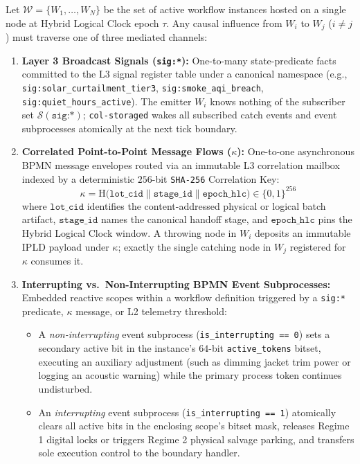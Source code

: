 \begin{definition}
\label{def:three-choreography-channels}
Let $\mathcal{W} = \{W_1, \dots, W_N\}$ be the set of active workflow instances hosted on a single node at
Hybrid Logical Clock epoch $\tau$. Any causal influence from $W_i$ to $W_j$ ($i \neq j$) must traverse one
of three mediated channels:
\begin{enumerate}
    \item \textbf{Layer 3 Broadcast Signals (\texttt{sig:*}):} One-to-many state-predicate facts committed
        to the L3 signal register table under a canonical namespace (e.g.,
        \texttt{sig:solar\_curtailment\_tier3}, \texttt{sig:smoke\_aqi\_breach},
        \texttt{sig:quiet\_hours\_active}). The emitter $W_i$ knows nothing of the subscriber set
        $\mathcal{S}(\texttt{sig:*})$; \texttt{col-storaged} wakes all subscribed catch events and event
        subprocesses atomically at the next tick boundary.
    \item \textbf{Correlated Point-to-Point Message Flows ($\kappa$):} One-to-one asynchronous BPMN
        message envelopes routed via an immutable L3 correlation mailbox indexed by a deterministic
        $256$-bit \texttt{SHA-256} Correlation Key:
    \begin{equation}
    \label{eq:correlation-key}
    \kappa = \mathrm{H}\bigl(\texttt{lot\_cid} \parallel \texttt{stage\_id} \parallel \texttt{epoch\_hlc}\bigr) \in \{0,1\}^{256}
    \end{equation}
    where $\texttt{lot\_cid}$ identifies the content-addressed physical or logical batch artifact,
    $\texttt{stage\_id}$ names the canonical handoff stage, and $\texttt{epoch\_hlc}$ pins the Hybrid
    Logical Clock window. A throwing node in $W_i$ deposits an immutable IPLD payload under $\kappa$;
    exactly the single catching node in $W_j$ registered for $\kappa$ consumes it.
    \item \textbf{Interrupting vs.\ Non-Interrupting BPMN Event Subprocesses:} Embedded reactive scopes
        within a workflow definition \parencite{harel1987statecharts,omg2011bpmn} triggered by a
        \texttt{sig:*} predicate, $\kappa$ message, or L2 telemetry threshold:
    \begin{itemize}
        \item A \emph{non-interrupting} event subprocess (\texttt{is\_interrupting == 0}) sets a secondary
            active bit in the instance's $64$-bit \texttt{active\_tokens} bitset, executing an auxiliary
            adjustment (such as dimming jacket trim power or logging an acoustic warning) while the
            primary process token continues undisturbed.
        \item An \emph{interrupting} event subprocess (\texttt{is\_interrupting == 1}) atomically clears
            all active bits in the enclosing scope's bitset mask, releases Regime 1 digital locks or
            triggers Regime 2 physical salvage parking, and transfers sole execution control to the
            boundary handler.
    \end{itemize}
\end{enumerate}
\end{definition}

